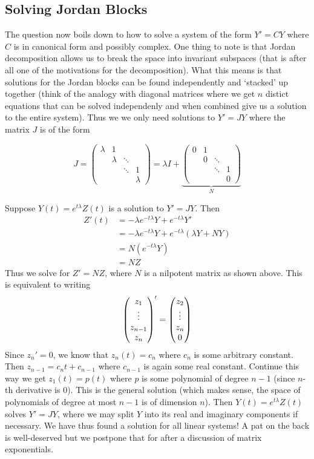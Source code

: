 \subsection{Solving Jordan Blocks}
The question now boils down to how to solve a system of the form $Y' = CY$ where $C$ is in canonical form and possibly complex. One thing to note is that Jordan decomposition allows us to break the space into invariant subspaces (that is after all one of the motivations for the decomposition). What this means is that solutions for the Jordan blocks can be found independently and `stacked' up together (think of the analogy with diagonal matrices where we get $n$ distict equations that can be solved independenly and when combined give us a solution to the entire system). Thus we we only need solutions to $Y' = JY$ where the matrix $J$ is of the form

$$ J = \begin{pmatrix}
\lambda& 1 \\
 & \lambda & \ddots\\
 & & \ddots & 1\\
& & &\lambda
\end{pmatrix} = \lambda I + 
\underbrace{\begin{pmatrix}
0& 1 \\
 & 0 & \ddots\\
 & & \ddots & 1\\
& & & 0
\end{pmatrix}}_{N}$$

Suppose $Y(t) = e^{t \lambda} Z(t)$ is a solution to $Y' = JY$. Then
\begin{align*}
    Z'(t) &= -\lambda e^{-t \lambda} Y + e^{-t \lambda} Y'\\
    &= -\lambda e^{-t \lambda} Y + e^{-t \lambda} (\lambda Y + NY)\\
    &= N(e^{-t \lambda} Y)\\
    &= NZ
\end{align*}
Thus we solve for $Z' = NZ$, where $N$ is a nilpotent matrix as shown above. This is equivalent to writing
\begin{align*}
    \begin{pmatrix} z_1  \\ \vdots \\ z_{n - 1} \\ z_n \end{pmatrix}' = \begin{pmatrix} z_2 \\ \vdots \\ z_n \\ 0 \end{pmatrix}
\end{align*}
Since $z_n' = 0$, we know that $z_n(t) = c_n$ where $c_n$ is some arbitrary constant. Then $z_{n - 1} = c_nt + c_{n - 1}$ where $c_{n-1}$ is again some real constant. Continue this way we get $z_1(t) = p(t)$ where $p$ is some polynomial of degree $n - 1$ (since $n$-th derivative is 0). This is the general solution (which makes sense, the space of polynomials of degree at most $n - 1$ is of dimension $n$). Then $Y(t) = e^{t \lambda} Z(t)$ solves $Y' = JY$, where we may split $Y$ into its real and imaginary components if necessary. We have thus found a solution for all linear systems! A pat on the back is well-deserved but we postpone that for after a discussion of matrix exponentials. 

